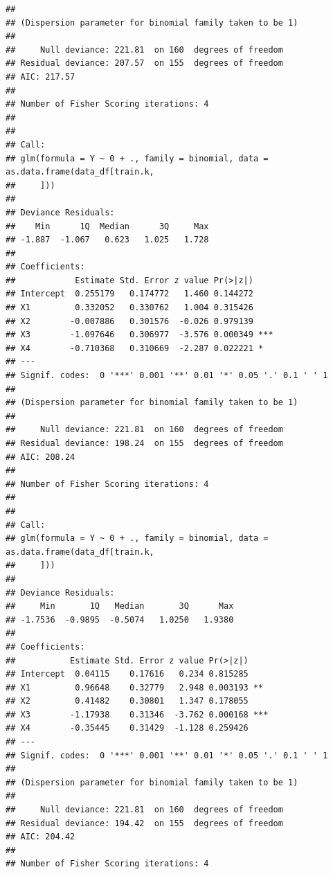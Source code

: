 \documentclass[
  11pt,
]{article}
\newenvironment{Shaded}{\begin{snugshade}}{\end{snugshade}}
\newcommand{\AttributeTok}[1]{\textcolor[rgb]{0.77,0.63,0.00}{#1}}
\newcommand{\CommentTok}[1]{\textcolor[rgb]{0.56,0.35,0.01}{\textit{#1}}}
\newcommand{\ConstantTok}[1]{\textcolor[rgb]{0.00,0.00,0.00}{#1}}
\newcommand{\FunctionTok}[1]{\textcolor[rgb]{0.00,0.00,0.00}{#1}}
\newcommand{\NormalTok}[1]{#1}
\newcommand{\OtherTok}[1]{\textcolor[rgb]{0.56,0.35,0.01}{#1}}
\newcommand{\SpecialCharTok}[1]{\textcolor[rgb]{0.00,0.00,0.00}{#1}}
\newcommand{\StringTok}[1]{\textcolor[rgb]{0.31,0.60,0.02}{#1}}
\begin{document}
\begin{verbatim}
## 
## (Dispersion parameter for binomial family taken to be 1)
## 
##     Null deviance: 221.81  on 160  degrees of freedom
## Residual deviance: 207.57  on 155  degrees of freedom
## AIC: 217.57
## 
## Number of Fisher Scoring iterations: 4
## 
## 
## Call:
## glm(formula = Y ~ 0 + ., family = binomial, data = as.data.frame(data_df[train.k, 
##     ]))
## 
## Deviance Residuals: 
##    Min      1Q  Median      3Q     Max  
## -1.887  -1.067   0.623   1.025   1.728  
## 
## Coefficients:
##            Estimate Std. Error z value Pr(>|z|)    
## Intercept  0.255179   0.174772   1.460 0.144272    
## X1         0.332052   0.330762   1.004 0.315426    
## X2        -0.007886   0.301576  -0.026 0.979139    
## X3        -1.097646   0.306977  -3.576 0.000349 ***
## X4        -0.710368   0.310669  -2.287 0.022221 *  
## ---
## Signif. codes:  0 '***' 0.001 '**' 0.01 '*' 0.05 '.' 0.1 ' ' 1
## 
## (Dispersion parameter for binomial family taken to be 1)
## 
##     Null deviance: 221.81  on 160  degrees of freedom
## Residual deviance: 198.24  on 155  degrees of freedom
## AIC: 208.24
## 
## Number of Fisher Scoring iterations: 4
## 
## 
## Call:
## glm(formula = Y ~ 0 + ., family = binomial, data = as.data.frame(data_df[train.k, 
##     ]))
## 
## Deviance Residuals: 
##     Min       1Q   Median       3Q      Max  
## -1.7536  -0.9895  -0.5074   1.0250   1.9380  
## 
## Coefficients:
##           Estimate Std. Error z value Pr(>|z|)    
## Intercept  0.04115    0.17616   0.234 0.815285    
## X1         0.96648    0.32779   2.948 0.003193 ** 
## X2         0.41482    0.30801   1.347 0.178055    
## X3        -1.17938    0.31346  -3.762 0.000168 ***
## X4        -0.35445    0.31429  -1.128 0.259426    
## ---
## Signif. codes:  0 '***' 0.001 '**' 0.01 '*' 0.05 '.' 0.1 ' ' 1
## 
## (Dispersion parameter for binomial family taken to be 1)
## 
##     Null deviance: 221.81  on 160  degrees of freedom
## Residual deviance: 194.42  on 155  degrees of freedom
## AIC: 204.42
## 
## Number of Fisher Scoring iterations: 4
\end{verbatim}

\begin{Shaded}
\end{Shaded}
\end{document}
